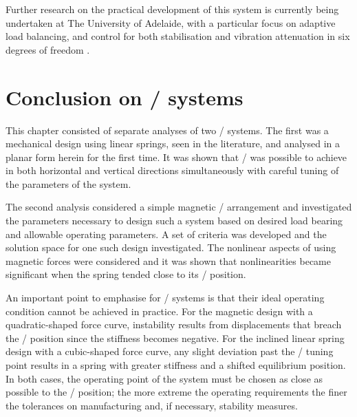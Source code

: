 \documentclass[11pt,a4paper]{memoir}
\begin{document}
Further research on the practical development of this system is currently being undertaken at The University of Adelaide, with a particular focus on adaptive load balancing, and control for both stabilisation and vibration attenuation in six degrees of freedom \cite{zhu2011-icmt}.

\section{Conclusion on \qzs/ systems}

This chapter consisted of separate analyses of two \qzs/ systems.
The first was a mechanical design using linear springs, seen in the literature, and analysed in a planar form herein for the first time.
It was shown that \qzs/ was possible to achieve in both horizontal and vertical directions simultaneously with careful tuning of the parameters of the system.

The second analysis considered a simple magnetic \qzs/ arrangement and investigated the parameters necessary to design such a system based on desired load bearing and allowable operating parameters.
A set of criteria was developed and the solution space for one such design investigated.
The nonlinear aspects of using magnetic forces were considered and it was shown that nonlinearities became significant when the spring tended close to its \qzs/ position.

An important point to emphasise for \qzs/ systems is that their ideal operating condition  cannot be achieved in practice.
For the magnetic design with a quadratic-shaped force curve, instability results from displacements that breach the \qzs/ position since the stiffness becomes negative.
For the inclined linear spring design with a cubic-shaped force curve, any slight deviation past the \qzs/ tuning point results in a spring with greater stiffness and a shifted equilibrium position.
In both cases, the operating point of the system must be chosen as close as possible to the \qzs/ position; the more extreme the operating requirements the finer the tolerances on manufacturing and, if necessary, stability measures.
\end{document}
